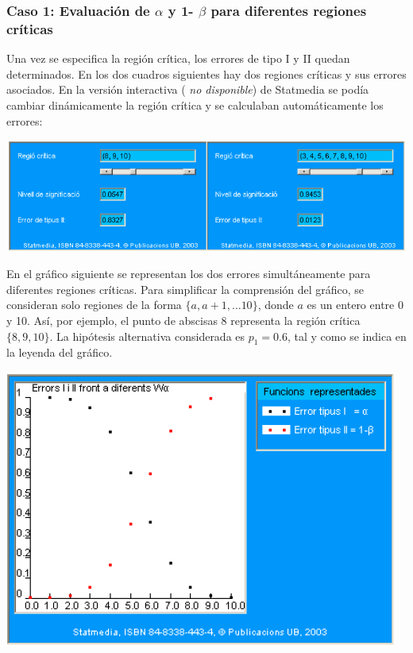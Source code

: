 \documentclass[
]{article}
\begin{document}
\subsubsection{\texorpdfstring{Caso 1: Evaluación de \(\alpha\) y 1- \(\beta\) para diferentes regiones críticas}{Caso 1: Evaluación de \textbackslash alpha y 1- \textbackslash beta para diferentes regiones críticas}}\label{caso-1-evaluaciuxf3n-de-alpha-y-1--beta-para-diferentes-regiones-cruxedticas}

Una vez se especifica la región crítica, los errores de tipo I y II quedan determinados. En los dos cuadros siguientes hay dos regiones críticas y sus errores asociados. En la versión interactiva ( \emph{no disponible}) de Statmedia se podía cambiar dinámicamente la región crítica y se calculaban automáticamente los errores:

\begin{center}\includegraphics[width=0.9\linewidth]{images/cap9-ProbsErrTipo2b} \end{center}

En el gráfico siguiente se representan los dos errores simultáneamente para diferentes regiones críticas. Para simplificar la comprensión del gráfico, se consideran solo regiones de la forma \(\{a, a+1, \ldots 10\}\), donde \(a\) es un entero entre 0 y 10. Así, por ejemplo, el punto de abscisas 8 representa la región crítica \(\{8,9,10\}\). La hipótesis alternativa considerada es \(p_{1}=0.6\), tal y como se indica en la leyenda del gráfico.

\begin{center}\includegraphics[width=0.9\linewidth]{images/cap9-PlotProbsErrTipo2b} \end{center}
\end{document}
